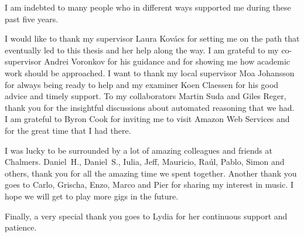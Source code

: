 I am indebted to many people who in different ways supported me during these past five years.

I would like to thank my supervisor Laura Kov\'acs for setting me on the path that eventually led to this thesis and her help along the way. I am grateful to my co-supervisor Andrei Voronkov for his guidance and for showing me how academic work should be approached. I want to thank my local supervisor Moa Johansson for always being ready to help and my examiner Koen Claessen for his good advice and timely support. To my collaborators Martin Suda and Giles Reger, thank you for the insightful discussions about automated reasoning that we had. I am grateful to Byron Cook for inviting me to visit Amazon Web Services and for the great time that I had there.

I was lucky to be surrounded by a lot of amazing colleagues and friends at Chalmers. Daniel~H., Daniel~S., Iulia, Jeff, Mauricio, Ra\'ul, Pablo, Simon and others, thank you for all the amazing time we spent together. Another thank you goes to Carlo, Grischa, Enzo, Marco and Pier for sharing my interest in music. I hope we will get to play more gigs in the future.

Finally, a very special thank you goes to Lydia for her continuous support and patience.

